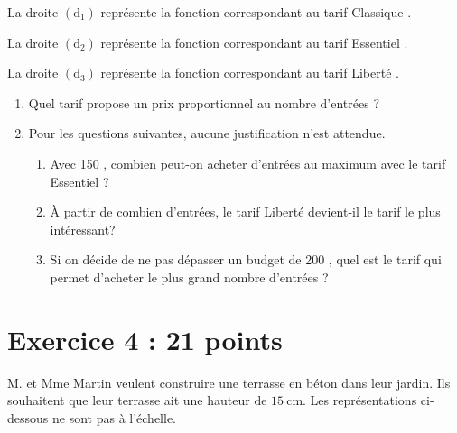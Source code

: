 \documentclass[11pt]{article}
\newcommand{\euro}{\eurologo{}}
\begin{document}
La droite $(\mathrm{d}_{1})$ représente la fonction correspondant au tarif \og{} Classique \fg{}.

La droite $(\mathrm{d}_{2})$ représente la fonction correspondant au tarif \og{} Essentiel \fg{}.

La droite $(\mathrm{d}_{3})$ représente la fonction correspondant au tarif \og{} Liberté \fg{}.

\begin{enumerate}[resume]

	\item Quel tarif propose un prix proportionnel au nombre d'entrées ?

	\item Pour les questions suivantes, aucune justification n'est attendue.

	\begin{enumerate}
		\item Avec 150 \euro{}, combien peut-on acheter d'entrées au maximum avec le tarif \og{} Essentiel \fg{}?
		\item À partir de combien d'entrées, le tarif \og{} Liberté \fg{} devient-il le tarif le plus intéressant?
		\item Si on décide de ne pas dépasser un budget de 200 \euro{}, quel est le tarif qui permet d'acheter le plus grand nombre d'entrées ?
	\end{enumerate}
\end{enumerate}

\section*{Exercice 4 : \hfill 21 points}
M. et Mme Martin veulent construire une terrasse en béton dans leur jardin. Ils souhaitent que leur terrasse ait une hauteur de $15 \mathrm{~cm}$. Les représentations ci-dessous ne sont pas à l'échelle.
\end{document}
